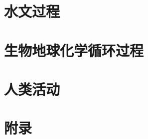 \documentclass[a4paper,12pt,twoside]{report}
\begin{document}
\part{水文过程}\label{part:hydro}

% 





\part{生物地球化学循环过程}\label{part:BGC}






\part{人类活动}\label{part:human}





%
%
%

\clearpage
{} %
\part*{附录}

\appendix
\clearpage



\clearpage
\renewcommand{\bibname}{参考文献}



\clearpage

\end{document}
